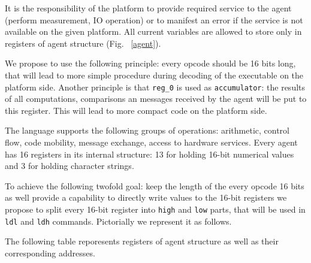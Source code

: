 \documentclass{scrreprt}
\begin{document}
It is the responsibility of the platform to provide required service to the agent (perform measurement, IO operation)
or to manifest an error if the service is not available on the given platform.
All current variables are allowed to store only in registers of agent structure (Fig. ~\ref{agent}).


We propose to use the following principle: every opcode should be 16 bits long,
that will lead to more simple procedure during decoding of the executable on the platform side.
Another principle is that \texttt{reg_0} is used as \texttt{accumulator}: the results of all computations,
comparisons an  messages received by the agent will be put to this register.
This will lead to more compact code on the platform side.


The language supports the following groups of operations: arithmetic, control flow, code mobility, message exchange, access to hardware services.
Every agent has 16 registers in its internal structure: 13 for holding 16-bit numerical values and 3 for holding character strings.

To achieve the following twofold goal: keep the length of the every opcode 16 bits as well provide
a capability to directly write values to the 16-bit registers we propose to split 
every 16-bit register into \texttt{high} and \texttt{low} parts,
that will be used in \texttt{ldl} and \texttt{ldh} commands.
Pictorially we represent it as follows.


The following table reporesents registers of agent structure as well as their corresponding addresses.
\end{document}
